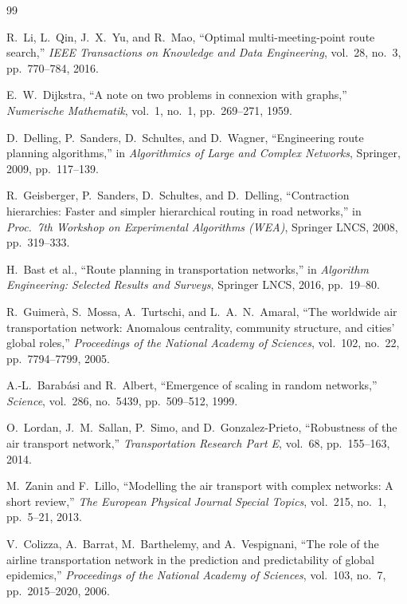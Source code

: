 \documentclass[review]{elsarticle}
\begin{document}

\begin{thebibliography}{99}

R.\ Li, L.\ Qin, J.\ X.\ Yu, and R.\ Mao, ``Optimal multi-meeting-point route search,'' \textit{IEEE Transactions on Knowledge and Data Engineering}, vol.~28, no.~3, pp.~770--784, 2016.

E.\ W.\ Dijkstra, ``A note on two problems in connexion with graphs,'' \textit{Numerische Mathematik}, vol.~1, no.~1, pp.~269--271, 1959.

D.\ Delling, P.\ Sanders, D.\ Schultes, and D.\ Wagner, ``Engineering route planning algorithms,'' in \textit{Algorithmics of Large and Complex Networks}, Springer, 2009, pp.~117--139.

R.\ Geisberger, P.\ Sanders, D.\ Schultes, and D.\ Delling, ``Contraction hierarchies: Faster and simpler hierarchical routing in road networks,'' in \textit{Proc.\ 7th Workshop on Experimental Algorithms (WEA)}, Springer LNCS, 2008, pp.~319--333.

H.\ Bast et al., ``Route planning in transportation networks,'' in \textit{Algorithm Engineering: Selected Results and Surveys}, Springer LNCS, 2016, pp.~19--80.

R.\ Guimerà, S.\ Mossa, A.\ Turtschi, and L.\ A.\ N.\ Amaral, ``The worldwide air transportation network: Anomalous centrality, community structure, and cities' global roles,'' \textit{Proceedings of the National Academy of Sciences}, vol.~102, no.~22, pp.~7794--7799, 2005.

A.-L.\ Barabási and R.\ Albert, ``Emergence of scaling in random networks,'' \textit{Science}, vol.~286, no.~5439, pp.~509--512, 1999.

O.\ Lordan, J.\ M.\ Sallan, P.\ Simo, and D.\ Gonzalez-Prieto, ``Robustness of the air transport network,'' \textit{Transportation Research Part E}, vol.~68, pp.~155--163, 2014.

M.\ Zanin and F.\ Lillo, ``Modelling the air transport with complex networks: A short review,'' \textit{The European Physical Journal Special Topics}, vol.~215, no.~1, pp.~5--21, 2013.

V.\ Colizza, A.\ Barrat, M.\ Barthelemy, and A.\ Vespignani, ``The role of the airline transportation network in the prediction and predictability of global epidemics,'' \textit{Proceedings of the National Academy of Sciences}, vol.~103, no.~7, pp.~2015--2020, 2006.


\end{thebibliography}
\end{document}
